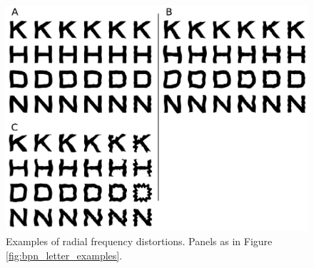 \documentclass[doc, 11pt,a4paper,natbib]{apa6}\usepackage[]{graphicx}\usepackage[]{color}
\begin{document}
\begin{figure}
	\centering
   \includegraphics[scale=1]{../figures/additional_letter_examples_RF.pdf}
   \caption{
	Examples of radial frequency distortions.
	Panels as in Figure \ref{fig:bpn_letter_examples}.
   }
   \label{fig:rf_letter_examples}
\end{figure}


\end{document}
